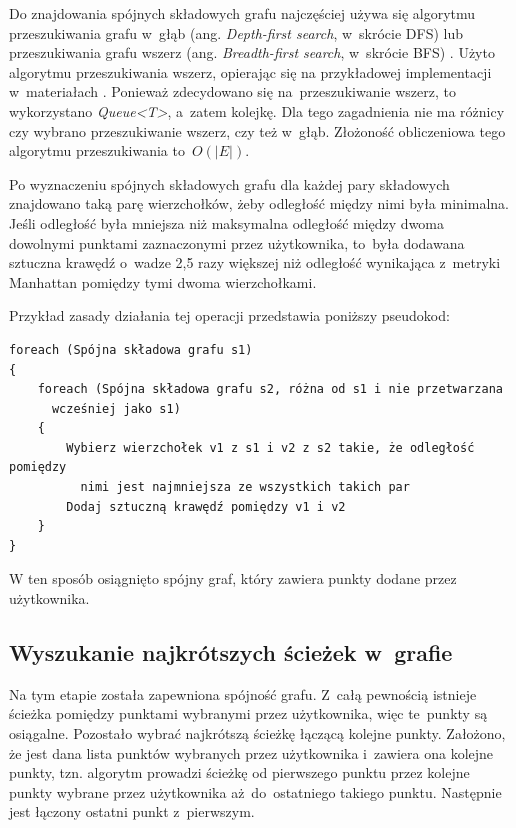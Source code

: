 \documentclass[a4paper,11pt,twoside,openright]{report}
\theoremstyle{definition}
\begin{document}
Do znajdowania spójnych składowych grafu najczęściej używa się algorytmu
przeszukiwania grafu w~głąb (ang. \textit{Depth-first search}, w~skrócie DFS) lub
przeszukiwania grafu wszerz (ang. \textit{Breadth-first search}, w~skrócie BFS)
\cite{Algorytmy Sedgewick}. Użyto algorytmu przeszukiwania wszerz, opierając się
na przykładowej implementacji w~materiałach \cite{AiSD2}. Ponieważ zdecydowano się
na~przeszukiwanie wszerz, to wykorzystano \textit{Queue<T>}, a~zatem kolejkę. Dla tego zagadnienia
nie ma różnicy czy wybrano przeszukiwanie wszerz, czy też w~głąb. Złożoność
obliczeniowa tego algorytmu przeszukiwania to~$O(|E|)$.

Po wyznaczeniu spójnych składowych grafu dla każdej pary składowych znajdowano
taką parę wierzchołków, żeby odległość między nimi była minimalna. Jeśli odległość
była mniejsza niż maksymalna odległość między dwoma dowolnymi punktami zaznaczonymi
przez użytkownika, to~była dodawana sztuczna krawędź o~wadze 2,5 razy większej
niż odległość wynikająca z~metryki Manhattan pomiędzy tymi dwoma wierzchołkami.

Przykład zasady działania tej operacji przedstawia poniższy pseudokod:

\begin{verbatim}
foreach (Spójna składowa grafu s1)
{
    foreach (Spójna składowa grafu s2, różna od s1 i nie przetwarzana
      wcześniej jako s1)
    {
        Wybierz wierzchołek v1 z s1 i v2 z s2 takie, że odległość pomiędzy
          nimi jest najmniejsza ze wszystkich takich par
        Dodaj sztuczną krawędź pomiędzy v1 i v2
    }
}
\end{verbatim}


W ten sposób osiągnięto spójny graf, który zawiera punkty dodane przez użytkownika.

\subsection {Wyszukanie najkrótszych ścieżek w~grafie}

Na tym etapie została zapewniona spójność grafu. Z~całą pewnością istnieje ścieżka
pomiędzy punktami wybranymi przez użytkownika, więc te~punkty są osiągalne. Pozostało
wybrać najkrótszą ścieżkę łączącą kolejne punkty. Założono, że jest dana lista
punktów wybranych przez użytkownika i~zawiera ona kolejne punkty, tzn. algorytm
prowadzi ścieżkę od pierwszego punktu przez kolejne punkty wybrane przez użytkownika
aż~do~ostatniego takiego punktu. Następnie jest łączony ostatni punkt z~pierwszym.
\end{document}
